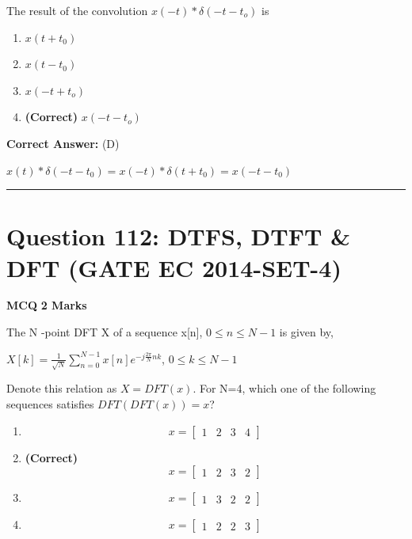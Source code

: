 \documentclass[11pt,a4paper]{article}
\begin{document}
\noindent The result of the convolution $x(-t)*\delta (-t-t_{o})$  is


\begin{enumerate}[label=(\Alph*)]
    \item $x(t+t_{0})$
    \item $x(t-t_{0})$
    \item $x(-t+t_{o})$
    \item \textbf{(Correct)} $x(-t-t_{o})$
\end{enumerate}

\noindent \textbf{Correct Answer:} (D)

\begin{tcolorbox}[solbox, title=Detailed Solution -- Question 111]
$x(t)*\delta (-t-t_0)=x(-t)*\delta (t+t_0)=x(-t-t_0)$
\end{tcolorbox}

\vspace{1.5em}
\hrule
\vspace{1.5em}

\section*{Question 112: DTFS, DTFT \& DFT (GATE EC 2014-SET-4)}
\noindent \textbf{\color{primary}MCQ} \hfill \textbf{\color{secondary}2 Marks}


\noindent The N -point DFT X of a sequence x[n], $0\leq n\leq N-1$ is given by, 

$X[k]=\frac{1}{\sqrt{N}}\sum_{n=0}^{N-1}x[n]e^{-j\frac{2\pi }{N}nk}$,   $0\leq k\leq N-1$  

 Denote this relation as $X = DFT(x)$. For N=4, which one of the following sequences satisfies $DFT(DFT(x)) = x$?


\begin{enumerate}[label=(\Alph*)]
    \item \[
x=\begin{bmatrix} 1 & 2 &3 &4 \end{bmatrix}
\]
    \item \textbf{(Correct)} \[
x=\begin{bmatrix} 1 & 2 &3 &2 \end{bmatrix}
\]
    \item \[
x=\begin{bmatrix} 1 & 3 &2 &2 \end{bmatrix}
\]
    \item \[
x=\begin{bmatrix} 1 & 2 &2 &3 \end{bmatrix}
\]
\end{enumerate}
\end{document}

